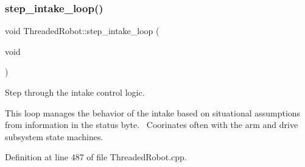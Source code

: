 \subsubsection{\texorpdfstring{step\+\_\+intake\+\_\+loop()}{step\_intake\_loop()}}
{\footnotesize\ttfamily void Threaded\+Robot\+::step\+\_\+intake\+\_\+loop (\begin{DoxyParamCaption}\item[{void}]{ }\end{DoxyParamCaption})\hspace{0.3cm}{\ttfamily [private]}}



Step through the intake control logic. 

This loop manages the behavior of the intake based on situational assumptions from information in the status byte.~\newline
 Coorinates often with the arm and drive subsystem state machines. 

Definition at line 487 of file Threaded\+Robot.\+cpp.


